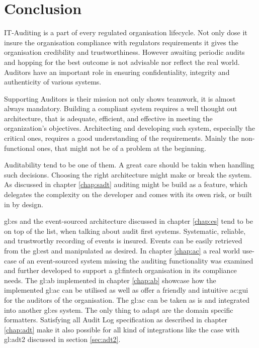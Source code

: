 %
\chapter{Conclusion}

IT-Auditing is a part of every regulated organisation lifecycle. Not only dose it insure the organisation compliance with regulators requirements it gives the organisation credibility and trustworthiness.  However awaiting periodic audits and hopping for the best outcome is not advisable nor reflect the real world. Auditors have an important role in ensuring confidentiality, integrity and authenticity of various systems.

Supporting Auditors is their mission not only shows teamwork, it is almost always mandatory. Building a compliant system requires a well thought out architecture, that is adequate, efficient, and effective in meeting the organization’s objectives. Architecting and developing such system, especially the critical ones, requires a good understanding of the requirements. Mainly the non-functional ones, that might not be of a problem at the beginning.

Auditability tend to be one of them. A great care should be takin when handling such decisions. Choosing the right architecture might make or break the system. As discussed in chapter \ref{chap:sadt} auditing might be build as a feature, which delegates the complexity on the developer and comes with its owen risk, or built in by design.

\gls{gl:es} and the event-sourced architecture discussed in chapter \ref{chap:es} tend to be on top of the list, when talking about audit first systems. Systematic, reliable, and trustworthy recording of events is insured. Events can be easily retrieved from the \gls{gl:est} and manipulated as desired. In chapter \ref{chap:ac} a real world use-case of an event-sourced system missing the auditing functionality was examined and further developed to support a \gls{gl:fintech} organisation in its compliance needs. The \gls{gl:ab} implemented in chapter \ref{chap:ab} showcase how the implemented \gls{gl:ac} can be utilised as well as offer a friendly and intuitive \gls{ac:gui} for the auditors of the organisation. The \gls{gl:ac} can be taken as is and integrated into another \gls{gl:es} system. The only thing to adapt are the domain specific formatters. Satisfying all Audit Log specification as described in chapter \ref{chap:adt} make it also possible for all kind of integrations like the case with \gls{gl:adt2} discussed in section \ref{sec:adt2}. 

